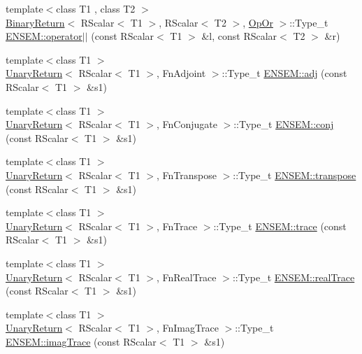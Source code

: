 \begin{DoxyCompactItemize}
\item 
{\footnotesize template$<$class T1 , class T2 $>$ }\\\mbox{\hyperlink{structBinaryReturn}{Binary\+Return}}$<$ R\+Scalar$<$ T1 $>$, R\+Scalar$<$ T2 $>$, \mbox{\hyperlink{structOpOr}{Op\+Or}} $>$\+::Type\+\_\+t \mbox{\hyperlink{group__rscalar_gad6b0ec6a8079826234d7bef5fa862c57}{E\+N\+S\+E\+M\+::operator$\vert$$\vert$}} (const R\+Scalar$<$ T1 $>$ \&l, const R\+Scalar$<$ T2 $>$ \&r)
\item 
{\footnotesize template$<$class T1 $>$ }\\\mbox{\hyperlink{structUnaryReturn}{Unary\+Return}}$<$ R\+Scalar$<$ T1 $>$, Fn\+Adjoint $>$\+::Type\+\_\+t \mbox{\hyperlink{group__rscalar_ga7c3fdb23cffd473f858244b3284a9620}{E\+N\+S\+E\+M\+::adj}} (const R\+Scalar$<$ T1 $>$ \&s1)
\item 
{\footnotesize template$<$class T1 $>$ }\\\mbox{\hyperlink{structUnaryReturn}{Unary\+Return}}$<$ R\+Scalar$<$ T1 $>$, Fn\+Conjugate $>$\+::Type\+\_\+t \mbox{\hyperlink{group__rscalar_ga24609fe5d05b5967e364924ef6d13929}{E\+N\+S\+E\+M\+::conj}} (const R\+Scalar$<$ T1 $>$ \&s1)
\item 
{\footnotesize template$<$class T1 $>$ }\\\mbox{\hyperlink{structUnaryReturn}{Unary\+Return}}$<$ R\+Scalar$<$ T1 $>$, Fn\+Transpose $>$\+::Type\+\_\+t \mbox{\hyperlink{group__rscalar_ga0a32a83382be7e92236abd5dc654c18d}{E\+N\+S\+E\+M\+::transpose}} (const R\+Scalar$<$ T1 $>$ \&s1)
\item 
{\footnotesize template$<$class T1 $>$ }\\\mbox{\hyperlink{structUnaryReturn}{Unary\+Return}}$<$ R\+Scalar$<$ T1 $>$, Fn\+Trace $>$\+::Type\+\_\+t \mbox{\hyperlink{group__rscalar_ga0d92a68fbffd9e97af74d7c35b92536b}{E\+N\+S\+E\+M\+::trace}} (const R\+Scalar$<$ T1 $>$ \&s1)
\item 
{\footnotesize template$<$class T1 $>$ }\\\mbox{\hyperlink{structUnaryReturn}{Unary\+Return}}$<$ R\+Scalar$<$ T1 $>$, Fn\+Real\+Trace $>$\+::Type\+\_\+t \mbox{\hyperlink{group__rscalar_gad8c5ca0fef5f4bc08eb384e14b4017fa}{E\+N\+S\+E\+M\+::real\+Trace}} (const R\+Scalar$<$ T1 $>$ \&s1)
\item 
{\footnotesize template$<$class T1 $>$ }\\\mbox{\hyperlink{structUnaryReturn}{Unary\+Return}}$<$ R\+Scalar$<$ T1 $>$, Fn\+Imag\+Trace $>$\+::Type\+\_\+t \mbox{\hyperlink{group__rscalar_ga93f83573ea0cfc6dca10a8bf879ab0a7}{E\+N\+S\+E\+M\+::imag\+Trace}} (const R\+Scalar$<$ T1 $>$ \&s1)

\end{DoxyCompactItemize}

